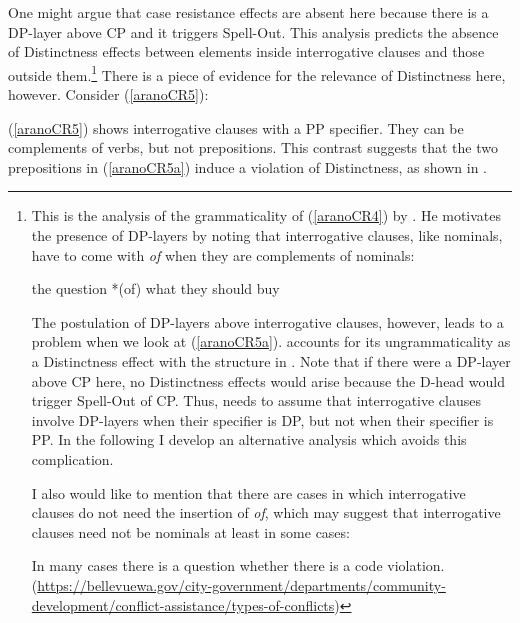 \documentclass[output=paper]{langscibook}
\begin{document}
One might argue that case resistance effects are absent here because there is a DP-layer above CP and it triggers Spell-Out. This analysis predicts the absence of Distinctness effects between elements inside interrogative clauses and those outside them.\footnote{This is the analysis of the grammaticality of (\ref{aranoCR4}) by \citet[139, 215 fn. 67]{Richards:2010}. He motivates the presence of DP-layers by noting that interrogative clauses, like nominals, have to come with \emph{of} when they are complements of nominals:

\ea 
the question *(of) {\ob}what they should buy{\cb} \\ \upshape \citep[139]{Richards:2010}
\z 

The postulation of  DP-layers above interrogative clauses, however, leads to a problem when we look at (\ref{aranoCR5a}). \cite{Richards:2010} accounts for its ungrammaticality as a Distinctness effect with the structure in . Note that if there were a DP-layer above CP here, no Distinctness effects would arise because the D-head would trigger Spell-Out of CP\@. Thus, \cite{Richards:2010} needs to assume that interrogative clauses involve DP-layers when their specifier is DP, but not when their specifier is PP\@. In the following I develop an alternative analysis which avoids this complication. 

I also would like to mention that there are cases in which interrogative clauses do not need the insertion of \emph{of}, which may suggest that interrogative clauses need not be nominals at least in some cases:

\ea 
In many cases there is a question whether there is a code violation. \\
{\normalfont(\url{https://bellevuewa.gov/city-government/departments/community-development/conflict-assistance/types-of-conflicts})}
\z} There is a piece of evidence for the relevance of Distinctness here, however. Consider (\ref{aranoCR5}):

\ea \label{aranoCR5}
\label{aranoCR5a} 
\z
\z 

\noindent (\ref{aranoCR5}) shows interrogative clauses with a PP specifier. They can be complements of verbs, but not prepositions. This contrast suggests that the two prepositions in (\ref{aranoCR5a}) induce a violation of Distinctness, as shown in .
\end{document}
